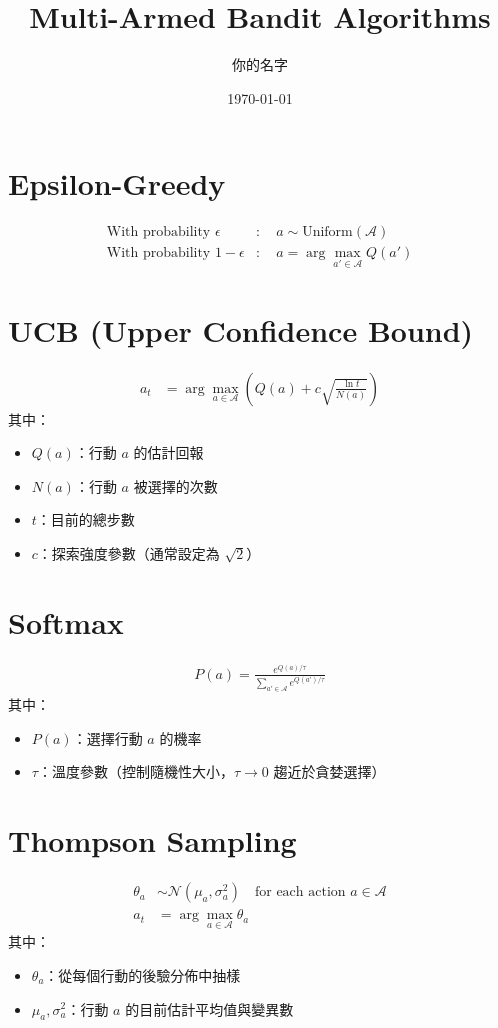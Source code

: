 \documentclass{article}
\begin{document}
\title{Multi-Armed Bandit Algorithms}
\author{你的名字}
\date{\today}
\maketitle

\section{Epsilon-Greedy}
\begin{align*}
\text{With probability } \epsilon &: \quad a \sim \text{Uniform}(\mathcal{A}) \\
\text{With probability } 1-\epsilon &: \quad a = \arg\max_{a' \in \mathcal{A}} Q(a')
\end{align*}

\section{UCB (Upper Confidence Bound)}
\begin{align*}
a_t &= \arg\max_{a \in \mathcal{A}} \left( Q(a) + c \sqrt{\frac{\ln t}{N(a)}} \right)
\end{align*}
其中：
\begin{itemize}
  \item \( Q(a) \)：行動 \(a\) 的估計回報
  \item \( N(a) \)：行動 \(a\) 被選擇的次數
  \item \( t \)：目前的總步數
  \item \( c \)：探索強度參數（通常設定為 \(\sqrt{2}\)）
\end{itemize}

\section{Softmax}
\begin{align*}
P(a) = \frac{e^{Q(a) / \tau}}{\sum_{a' \in \mathcal{A}} e^{Q(a') / \tau}}
\end{align*}
其中：
\begin{itemize}
  \item \( P(a) \)：選擇行動 \(a\) 的機率
  \item \( \tau \)：溫度參數（控制隨機性大小，\(\tau \to 0\) 趨近於貪婪選擇）
\end{itemize}

\section{Thompson Sampling}
\begin{align*}
\theta_a &\sim \mathcal{N}(\mu_a, \sigma_a^2) \quad \text{for each action } a \in \mathcal{A} \\
a_t &= \arg\max_{a \in \mathcal{A}} \theta_a
\end{align*}
其中：
\begin{itemize}
  \item \(\theta_a\)：從每個行動的後驗分佈中抽樣
  \item \(\mu_a, \sigma_a^2\)：行動 \(a\) 的目前估計平均值與變異數
\end{itemize}
\end{document}
